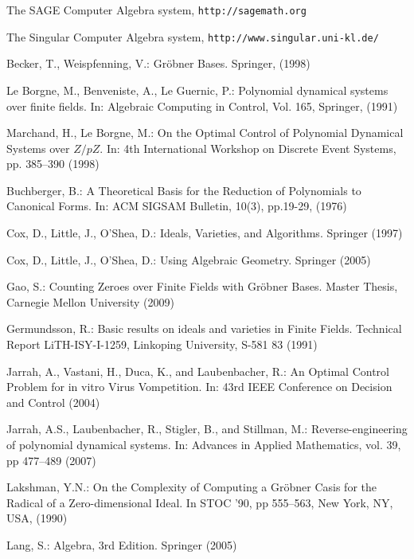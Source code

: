 \documentclass[envcountsect]{llncs}
\begin{document}
{{\begin{thebibliography}{20}

 The SAGE Computer Algebra system, {\tt http://sagemath.org}

 The Singular Computer Algebra system, {\tt http://www.singular.uni-kl.de/}

 {Becker, T., Weispfenning, V.}: {Gr\"obner Bases}. Springer, (1998)

 {Le Borgne, M., Benveniste, A., Le Guernic, P.}: {Polynomial dynamical systems over finite fields}. In: {Algebraic Computing in Control}, Vol. 165, Springer, (1991)


 Marchand, H., Le Borgne, M.: On the Optimal Control of Polynomial Dynamical Systems over $Z/p{Z}$. In: 4th International Workshop on Discrete Event Systems, pp. {385--390} (1998)


 Buchberger, B.: A Theoretical Basis for the Reduction of Polynomials to Canonical
Forms. In: ACM SIGSAM Bulletin, 10(3), pp.19-29, (1976)

 Cox, D., Little, J., O'Shea, D.: Ideals, Varieties, and Algorithms. Springer (1997)

 Cox, D., Little, J., O'Shea, D.: Using Algebraic Geometry. Springer (2005)

 Gao, S.: Counting Zeroes over Finite Fields with Gr\"obner Bases. Master Thesis, Carnegie Mellon University (2009)

 Germundsson, R.: Basic results on ideals and varieties in Finite Fields. Technical
Report LiTH-ISY-I-1259, Linkoping University, S-581 83 (1991)

 Jarrah, A., Vastani, H., Duca, K., and Laubenbacher, R.: An Optimal Control Problem
for in vitro Virus Vompetition. In: 43rd IEEE Conference on Decision and Control (2004)

 Jarrah, A.S., Laubenbacher, R., Stigler, B., and Stillman, M.: Reverse-engineering of
polynomial dynamical systems. In: Advances in Applied Mathematics, vol. 39, pp 477--489 (2007)

 Lakshman, Y.N.: On the Complexity of Computing a Gr\"obner Casis for the Radical
of a Zero-dimensional Ideal. In STOC '90, pp 555--563, New York, NY, USA, (1990)

 Lang, S.: Algebra, 3rd Edition. Springer (2005)


\end{thebibliography}}}
\end{document}
